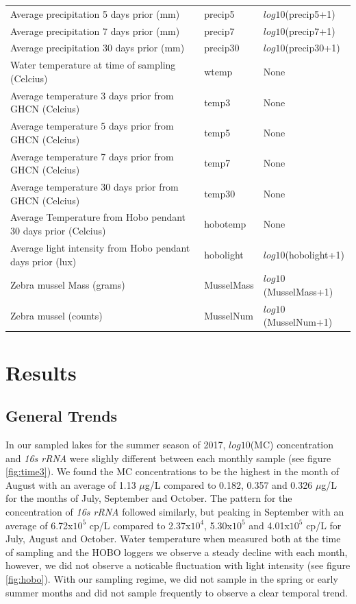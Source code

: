 \begin{center}
\begin{longtable}{p{3.5cm}p{1cm}p{3.3cm}}
Average precipitation 5 days prior (mm)  & precip5 & $log10$(precip5+1) \\
Average precipitation 7 days prior (mm) & precip7 &  $log10$(precip7+1) \\
Average precipitation 30 days prior (mm) & precip30 &  $log10$(precip30+1) \\
Water temperature at time of sampling (Celcius) & wtemp & None \\
Average temperature 3 days prior from GHCN (Celcius) & temp3&  None \\
Average temperature 5 days prior from GHCN (Celcius) & temp5 & None \\
Average temperature 7 days prior  from GHCN (Celcius) &  temp7 & None \\
Average temperature 30 days prior from GHCN (Celcius) & temp30 &  None \\
Average Temperature from Hobo pendant 30 days prior (Celcius) & hobotemp & None \\
Average light intensity from Hobo pendant days prior (lux) & hobolight & $log10$(hobolight+1) \\
Zebra mussel Mass (grams) & MusselMass &  $log10$(MusselMass+1) \\
Zebra mussel (counts) &  MusselNum & $log10$(MusselNum+1) \\
\hline
\end{longtable}
\end{center}

\section{Results} 
\subsection{General Trends}
In our sampled lakes for the summer season of 2017, $log10$(MC) concentration and \emph{16s rRNA} were slighly different between each monthly sample (see figure \ref{fig:time3}). We found the MC concentrations to be the highest in the month of August with an average of 1.13 $\mu$g/L compared to 0.182, 0.357 and 0.326 $\mu$g/L for the months of July, September and October. The pattern for the concentration of \emph{16s rRNA} followed similarly, but peaking in September with an average of 6.72x$10^5$ cp/L compared to 2.37x$10^4$, 5.30x$10^5$ and 4.01x$10^5$ cp/L for July, August and October. Water temperature when measured both at the time of sampling and the HOBO loggers we observe a steady decline with each month, however, we did not observe a noticable fluctuation with light intensity (see figure \ref{fig:hobo}). With our sampling regime, we did not sample in the spring or early summer months and did not sample frequently to observe a clear temporal trend. 

